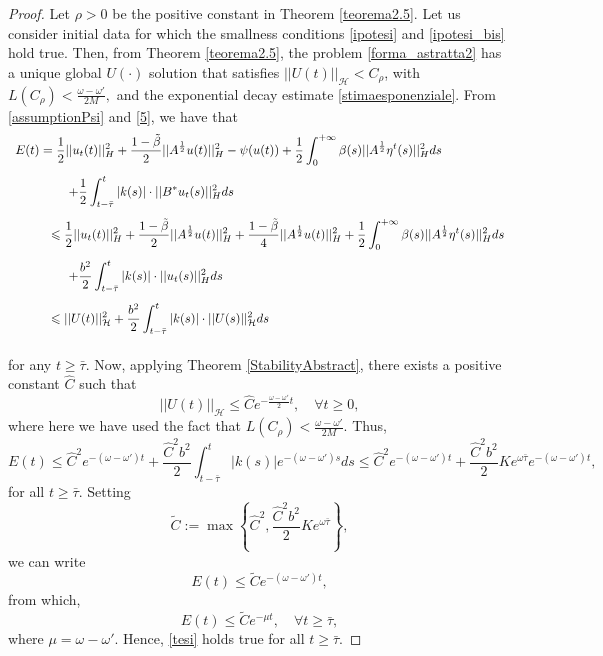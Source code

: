 \documentclass[11pt]{article}
\renewcommand{\geq}{\geqslant}
\renewcommand{\leq}{\leqslant}
\begin{document}
\begin{proof}
Let $\rho>0$ be the positive constant in Theorem \ref{teorema2.5}. Let us consider initial data for which the smallness conditions \eqref{ipotesi} and   \eqref{ipotesi_bis} hold true. Then, from Theorem \ref{teorema2.5}, the problem \eqref{forma_astratta2} has a unique global $U(\cdot)$ solution that satisfies $||U(t)||_\mathcal{H}<C_{\rho}$, with $L(C_{\rho})<\frac{\omega-\omega'}{2M},$ and the exponential decay estimate \eqref{stimaesponenziale}. From \eqref{assumptionPsi} and \eqref{5}, we have that
$$
\begin{array}{l}
	\vspace{0.3cm}\displaystyle{E(t)=\frac{1}{2}||u_t(t)||_H^2+\frac{1-\tilde{\beta}}{2}||A^{\frac 12}u(t)||^2_H-\psi(u(t))  +\frac{1}{2}\int_0^{+\infty} \beta(s) ||A^{\frac 1 2} \eta^t(s)||^2_H ds}\\
	\vspace{0.3cm}\displaystyle{\hspace{1.5cm}+\frac{1}{2}\int_{t-\bar\tau}^t |k(s)|\cdot ||B^*u_t(s)||_H^2 ds}\\
	\vspace{0.3cm}\displaystyle{\hspace{1cm}\leq\frac{1}{2}||u_t(t)||_H^2+\frac{1-\tilde{\beta}}{2}||A^{\frac 12}u(t)||^2_H+\frac{1-\tilde{\beta}}{4}||A^{\frac 12}u(t)||^2_H +\frac{1}{2}\int_0^{+\infty} \beta(s) ||A^{\frac 1 2} \eta^t(s)||^2_H ds}\\
	\vspace{0.3cm}\displaystyle{\hspace{1.5cm}+\frac{b^2}{2}\int_{t-\bar\tau}^t |k(s)|\cdot ||u_t(s)||_H^2 ds}\\
	\vspace{0.3cm}\displaystyle{\hspace{1cm}\leq||U(t)||_\mathcal{H}^2+\frac{b^2}{2}\int_{t-\bar\tau}^t |k(s)|\cdot ||U(s)||_{\mathcal{H}}^2 ds}
\end{array} 
$$
for any $t\geq \bar{\tau}$. Now, applying Theorem \ref{StabilityAbstract}, there exists a positive constant $\hat{C}$ such that
\begin{equation}\label{11}
||U(t)||_\mathcal{H} \leq \hat{C}e^{-\frac{\omega-\omega'}{2} t},\quad\forall t\geq 0,
\end{equation}
where here we have used the fact that $L(C_{\rho})<\frac{\omega-\omega'}{2M}$.
Thus,
$$E(t)\leq \hat{C}^2
e^{-(\omega-\omega') t}+\frac{\hat{C}^2b^2}{2}\int_{t-\bar{\tau}}^{t}|k(s)|e^{-(\omega-\omega')s}ds\leq \hat{C}^2e^{-(\omega-\omega') t}+\frac{\hat{C}^2b^2}{2}Ke^{\omega\bar{\tau}}e^{-(\omega-\omega')t},$$for all $t\geq \bar{\tau}$. Setting
$$\tilde{C}:=\max\left\{\hat{C}^2,\frac{\hat{C}^2b^2}{2}Ke^{\omega\bar{\tau}}\right\},$$
we can write
$$E(t)\leq \tilde{C}e^{-(\omega-\omega')t},$$
from which, 
$$E(t)\leq \tilde{C}e^{-\mu t}, \quad\forall t\geq \bar{\tau},$$
where $\mu =\omega-\omega'$. Hence, \eqref{tesi} holds true for all $t\geq \bar{\tau}$.
\end{proof}
\end{document}
